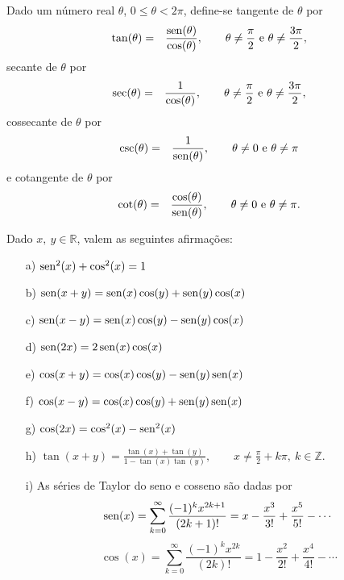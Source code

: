 \begin{defn}
Dado um número real $\theta$, $0\leq \theta<2\pi$, define-se tangente de $\theta$ por
\begin{eqnarray*}
\tan(\theta)&=&\frac{\operatorname{sen}(\theta)}{\cos(\theta)},\qquad \theta\neq \frac{\pi}{2}\ \hbox{e}\ \theta\neq \frac{3\pi}{2},\\
\end{eqnarray*}
secante de $\theta$ por
\begin{eqnarray*}
\sec(\theta)&=&\frac{1}{\cos(\theta)},\qquad \theta\neq \frac{\pi}{2}\ \hbox{e}\ \theta\neq \frac{3\pi}{2},\\
\end{eqnarray*}
cossecante de $\theta$ por
\begin{eqnarray*}
\csc(\theta)&=&\frac{1}{\sen(\theta)},\qquad \theta\neq 0\ \hbox{e}\ \theta\neq \pi\\
\end{eqnarray*}
e
cotangente de $\theta$ por
\begin{eqnarray*}
\cot(\theta)&=&\frac{\cos(\theta)}{\operatorname{sen}(\theta)},\qquad \theta\neq 0\ \hbox{e}\ \theta\neq \pi.\\
\end{eqnarray*}
\end{defn}
\begin{prop} Dado $x,\ y\in \mathbb{R}$, valem as seguintes afirmações:
\begin{itemize}
\item[a)] $\operatorname{sen}^2(x)+\cos^2(x)=1$
\item[b)] $\operatorname{sen}(x+y)=\operatorname{sen}(x)\cos(y)+\operatorname{sen}(y)\cos(x)$
\item[c)] $\operatorname{sen}(x-y)=\operatorname{sen}(x)\cos(y)-\operatorname{sen}(y)\cos(x)$
\item[d)] $\operatorname{sen}(2x)=2\operatorname{sen}(x)\cos(x)$
\item[e)] $\cos(x+y)=\cos(x)\cos(y)-\operatorname{sen}(y)\operatorname{sen}(x)$
\item[f)] $\cos(x-y)=\cos(x)\cos(y)+\operatorname{sen}(y)\operatorname{sen}(x)$
\item[g)] $\cos(2x)=\cos^2(x)-\operatorname{sen}^2(x)$
\item[h)] $\tan(x+y)=\frac{\tan(x)+\tan(y)}{1-\tan(x)\tan(y)},\qquad x\neq \frac{\pi}{2}+k\pi,\ k\in\mathbb{Z}.$
\item[i)] As séries de Taylor do seno e cosseno são dadas por
$$\operatorname{sen}(x)=\sum_{k=0}^\infty\frac{(-1)^k x^{2k+1}}{(2k+1)!}=x-\frac{x^3}{3!}+\frac{x^5}{5!}-\cdots $$
$$\cos(x)=\sum_{k=0}^\infty\frac{(-1)^k x^{2k}}{(2k)!}=1-\frac{x^2}{2!}+\frac{x^4}{4!}-\cdots $$
\end{itemize}
\end{prop}

